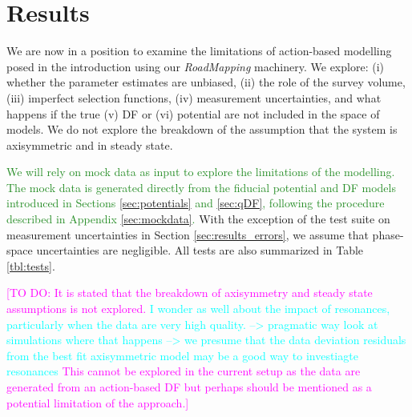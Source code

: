 \documentclass[iop,revtex4]{emulateapj}
\newcommand{\RM}{{\sl RoadMapping}}
\newcommand{\HW}[1]{\textcolor{Cyan}{#1}}
\newcommand{\NEW}[1]{\textcolor{ForestGreen}{#1}}
\newcommand{\Wilma}[1]{\textcolor{Magenta}{#1}}
\begin{document}
\section{Results} \label{sec:results}

We are now in a position to examine the limitations of action-based modelling posed in the introduction using our \RM{} machinery. We explore: (i) whether the parameter estimates are unbiased, (ii) the role of the survey volume, (iii) imperfect selection functions, (iv) measurement uncertainties, and what happens if the true (v) DF or (vi) potential are not included in the space of models. We do not explore the breakdown of the assumption that the system is axisymmetric and in steady state.

\NEW{We will rely on mock data as input to explore the limitations of the modelling. The mock data is generated directly from the fiducial potential and DF models introduced in Sections \ref{sec:potentials} and \ref{sec:qDF}, following the procedure described in Appendix \ref{sec:mockdata}.} With the exception of the test suite on measurement uncertainties in Section \ref{sec:results_errors}, we assume that phase-space uncertainties are negligible. All tests are also summarized in Table \ref{tbl:tests}. 

\Wilma{[TO DO: It is stated that the breakdown of axisymmetry and steady state assumptions is not explored. \HW{I wonder as well about the impact of resonances, particularly when the data are very high quality. --> pragmatic way look at simulations where that happens
--> we presume that the data deviation residuals from the best fit
axisymmetric model may be a good way to investiagte resonances
} This cannot be explored in the current setup as the data are generated from an action-based DF but perhaps should be mentioned as a potential limitation of the approach.]}

\end{document}
